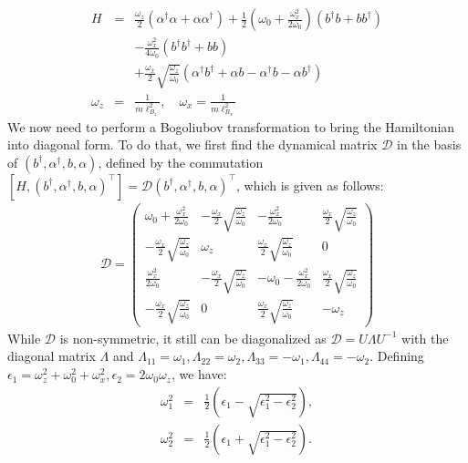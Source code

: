 \documentclass[twocolumn,showpacs,amsmath,amstex,amssymb,mathfonts,prb]{revtex4-1}
\begin{document}
\begin{eqnarray}\label{h4}
H&=&\frac{\omega_z}{2}\left(\alpha^\dagger\alpha+\alpha\alpha^\dagger\right)+\frac{1}{2}\left(\omega_0+\frac{\omega_x^2}{2\omega_0}\right)\left(b^\dagger b+bb^\dagger\right)\nonumber\\
&&-\frac{\omega_x^2}{4\omega_0}\left(b^\dagger b^\dagger +bb\right)\nonumber\\
&&+\frac{\omega_x}{2}\sqrt{\frac{\omega_z}{\omega_0}}\left(\alpha^\dagger b^\dagger+\alpha b-\alpha^\dagger b-\alpha b^\dagger\right)\\
\omega_z&=&\frac{1}{m\ell_{B_z}^2},\quad\omega_x=\frac{1}{m\ell_{B_x}^2}
\end{eqnarray}
We now need to perform a Bogoliubov transformation to bring the Hamiltonian into diagonal form. To do that, we first find the dynamical matrix\cite{xiao} $\mathcal D$ in the basis of $\left(b^\dagger,\alpha^\dagger,b,\alpha\right)$, defined by the commutation $[H,\left(b^\dagger,\alpha^\dagger,b,\alpha\right)^\intercal]=\mathcal D\left(b^\dagger,\alpha^\dagger,b,\alpha\right)^\intercal$, which is given as follows:
\begin{eqnarray}\label{dm}
\mathcal D=\left(\begin{array}{cccc}
\omega_0+\frac{\omega_x^2}{2\omega_0}& -\frac{\omega_x}{2}\sqrt{\frac{\omega_z}{\omega_0}} & -\frac{\omega_x^2}{2\omega_0} & \frac{\omega_x}{2}\sqrt{\frac{\omega_z}{\omega_0}}\\
-\frac{\omega_x}{2}\sqrt{\frac{\omega_z}{\omega_0}} & \omega_z & \frac{\omega_x}{2}\sqrt{\frac{\omega_z}{\omega_0}} & 0\\
\frac{\omega_x^2}{2\omega_0} & -\frac{\omega_x}{2}\sqrt{\frac{\omega_z}{\omega_0}} &-\omega_0-\frac{\omega_x^2}{2\omega_0} &\frac{\omega_x}{2}\sqrt{\frac{\omega_z}{\omega_0}}\\
-\frac{\omega_x}{2}\sqrt{\frac{\omega_z}{\omega_0}} & 0 & \frac{\omega_x}{2}\sqrt{\frac{\omega_z}{\omega_0}} & -\omega_z\end{array}
\right)
\end{eqnarray}
While $\mathcal D$ is non-symmetric, it still can be diagonalized as $\mathcal D=U\Lambda U^{-1}$ with the diagonal matrix $\Lambda$ and $\Lambda_{11}=\omega_1,\Lambda_{22}=\omega_2,\Lambda_{33}=-\omega_1,\Lambda_{44}=-\omega_2$. Defining $\epsilon_1=\omega_z^2+\omega_0^2+\omega_x^2, \epsilon_2=2\omega_0\omega_z$, we have:
\begin{eqnarray}\label{AB}
\omega_1^2&=&\frac{1}{2}\left(\epsilon_1-\sqrt{\epsilon_1^2-\epsilon_2^2}\right),\label{omega1}\\
\omega_2^2&=&\frac{1}{2}\left(\epsilon_1+\sqrt{\epsilon_1^2-\epsilon_2^2}\right).\label{omega2}
\end{eqnarray}
\end{document}
